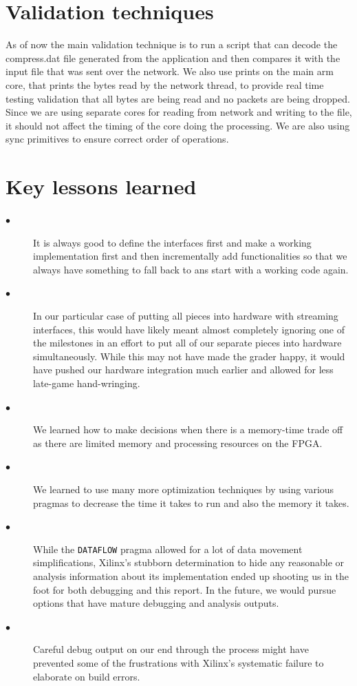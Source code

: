 \documentclass{article}
\begin{document}
\section{Validation techniques}
As of now the main validation technique is to run a script that can decode the compress.dat file generated from the application and then compares it with the input file that was sent over the network. 
\newline\newline
We also use prints on the main arm core, that prints the bytes read by the network thread, to provide real time testing validation that all bytes are being read and no packets are being dropped. 
\newline\newline
Since we are using separate cores for reading from network and writing to the file, it should not affect the timing of the core doing the processing. We are also using sync primitives to ensure correct order of operations.
\newline\newline
\section{Key lessons learned}
\begin{description}
  \item[$\bullet$ ] It is always good to define the interfaces first and make a working implementation first and then incrementally add functionalities so that we always have something to fall back to ans start with a working code again.
  \item[$\bullet$ ] In our particular case of putting all pieces into hardware with streaming interfaces, this would have likely meant almost completely ignoring one of the milestones in an effort to put all of our separate pieces into hardware simultaneously. While this may not have made the grader happy, it would have pushed our hardware integration much earlier and allowed for less late-game hand-wringing.
  \item[$\bullet$ ] We learned how to make decisions when there is a memory-time trade off as there are limited memory and processing resources on the FPGA. 
  \item[$\bullet$ ] We learned to use many more optimization techniques by using various pragmas to decrease the time it takes to run and also the memory it takes. 
  \item[$\bullet$ ] While the \texttt{DATAFLOW} pragma allowed for a lot of data movement simplifications, Xilinx's stubborn determination to hide any reasonable or analysis information about its implementation ended up shooting us in the foot for both debugging and this report. In the future, we would pursue options that have mature debugging and analysis outputs.
  \item[$\bullet$ ] Careful debug output on our end through the process might have prevented some of the frustrations with Xilinx's systematic failure to elaborate on build errors.


\end{description}
\end{document}
